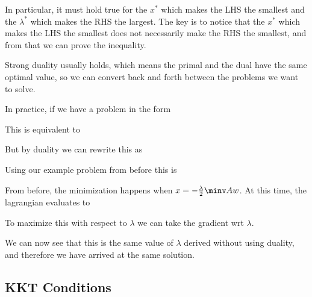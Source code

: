 \documentclass[12pt]{article}
\begin{document}

In particular, it must hold true for the $x^*$ which makes the LHS the smallest and the $\lambda^*$ which makes the RHS the largest. The key is to notice that the $x^*$ which makes the LHS the smallest does not necessarily make the RHS the smallest, and from that we can prove the inequality.


Strong duality usually holds, which means the primal and the dual have the same optimal value, so we can convert back and forth between the problems we want to solve.

In practice, if we have a problem in the form


This is equivalent to

But by duality we can rewrite this as


Using our example problem from before this is


From before, the minimization happens when $x = -\frac{\lambda}{2} \minv A w$. At this time, the lagrangian evaluates to


To maximize this with respect to $\lambda$ we can take the gradient wrt $\lambda$.


We can now see that this is the same value of $\lambda$ derived without using duality, and therefore we have arrived at the same solution.

\subsection{KKT Conditions}
\end{document}
